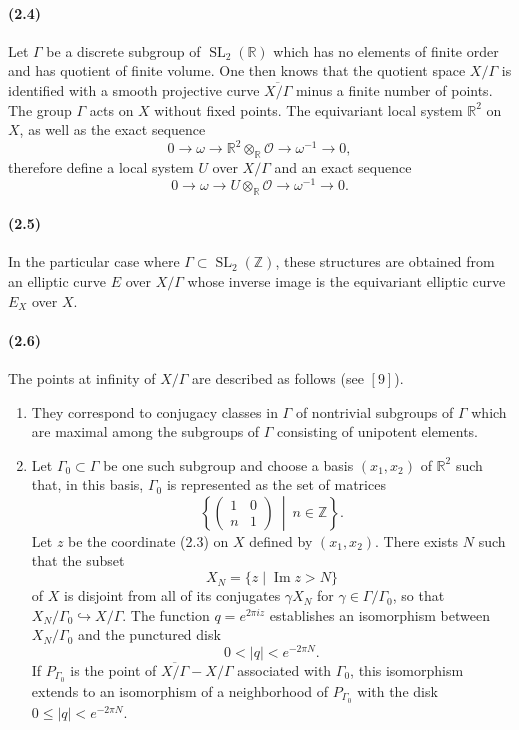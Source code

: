 \documentclass[10pt]{article}
\newcommand{\R}{\mathbb R}
\newcommand{\Z}{\mathbb Z}
\newcommand{\SL}{\operatorname{SL}}
\newcommand{\cO}{\mathcal O}
\begin{document}
\paragraph{(2.4)}
Let $\Gamma$ be a discrete subgroup of $\SL_2(\R)$ which has no elements of finite
order and has quotient of finite volume. One then knows that the quotient space $X/\Gamma$
is identified with a smooth projective curve $\overline{X/\Gamma}$ minus a finite number of
points. The group $\Gamma$ acts on $X$ without fixed points. The equivariant local system
$\R^2$ on $X$, as well as the exact sequence
\[
0\to \omega\to \R^2\otimes_\R\cO\to\omega^{-1}\to 0,
\]
therefore define a local system $U$ over $X/\Gamma$ and an exact sequence
\[
0\to \omega\to U\otimes_\R\cO\to\omega^{-1}\to 0.
\]

\paragraph{(2.5)}
In the particular case where $\Gamma\subset\SL_2(\Z)$, these structures are obtained
from an elliptic curve $E$ over $X/\Gamma$ whose inverse image is the equivariant elliptic
curve $E_X$ over $X$.

\paragraph{(2.6)}
The points at infinity of $X/\Gamma$ are described as follows (see \([9]\)).

\begin{enumerate}[label=(\alph*)]
\item They correspond to conjugacy classes in $\Gamma$ of nontrivial subgroups of
$\Gamma$ which are maximal among the subgroups of $\Gamma$ consisting of unipotent
elements.

\item Let $\Gamma_0\subset \Gamma$ be one such subgroup and choose a basis $(x_1,x_2)$
of $\R^2$ such that, in this basis, $\Gamma_0$ is represented as the set of matrices
\[
\left\{\begin{pmatrix}1&0\\ n&1\end{pmatrix}\ \middle|\ n\in\Z\right\}.
\]
Let $z$ be the coordinate (2.3) on $X$ defined by $(x_1,x_2)$. There exists $N$ such that
the subset
\[
X_N=\{z\mid \operatorname{Im}z>N\}
\]
of $X$ is disjoint from all of its conjugates $\gamma X_N$ for $\gamma\in\Gamma/\Gamma_0$,
so that $X_N/\Gamma_0\hookrightarrow X/\Gamma$. The function
$q=e^{2\pi iz}$ establishes an isomorphism between $X_N/\Gamma_0$ and the punctured
disk
\[
0<|q|<e^{-2\pi N}.
\]
If $P_{\Gamma_0}$ is the point of $\overline{X/\Gamma}-X/\Gamma$ associated with
$\Gamma_0$, this isomorphism extends to an isomorphism of a neighborhood of
$P_{\Gamma_0}$ with the disk $0\le |q|<e^{-2\pi N}$.
\end{enumerate}
\end{document}
